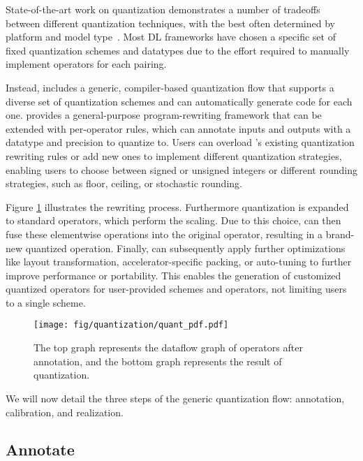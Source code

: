 State-of-the-art work on quantization demonstrates a number of tradeoffs
  between different quantization techniques,
  with the best often determined by platform and model type~\citep{krishnamoorthi18}.
Most DL frameworks have chosen a specific set of fixed quantization
  schemes and datatypes due to the effort required to manually implement operators for
  each pairing.

Instead, \relay includes a generic, compiler-based quantization flow that supports a diverse set
  of quantization schemes and can automatically generate code for each one.
\relay provides a general-purpose program-rewriting framework that can be extended
  with per-operator rules, which can annotate inputs and outputs with a datatype
  and precision to quantize to.
Users can overload \relay's existing quantization rewriting rules or add new ones
  to implement different quantization strategies, enabling users to choose between
  signed or unsigned integers or different rounding strategies, such as
  floor, ceiling, or stochastic rounding.

Figure \ref{fig:quant_flow} illustrates the rewriting process.
Furthermore quantization is expanded to standard
  \relay operators, which perform the scaling.
Due to this choice, \relay can then fuse these elementwise operations
  into the original operator, resulting in a brand-new quantized operation.
Finally, \relay can subsequently apply further optimizations like
  layout transformation, accelerator-specific packing, or
  auto-tuning to further improve performance or portability.
This enables the generation of customized quantized operators
  for user-provided schemes and operators,
  not limiting users to a single scheme.

\begin{figure}[h]
  \texttt{[image: fig/quantization/quant\_pdf.pdf]}
  \caption{\textmd{The top graph represents the dataflow graph of operators after annotation,
  and the bottom graph represents the result of quantization.}}
  \label{fig:quant_flow}
\end{figure}

We will now detail the three steps of the generic quantization flow:
  annotation, calibration, and realization.

\subsection*{Annotate}


